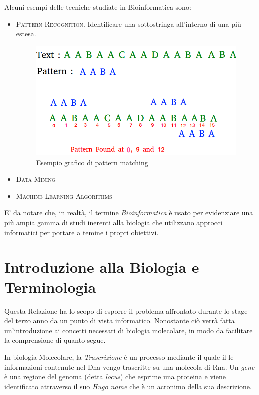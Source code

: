 Alcuni esempi delle tecniche studiate in Bioinformatica sono:

\begin{itemize}
    \item \textsc{Pattern Recognition.} Identificare una sottostringa all'interno di una più estesa.
        \begin{figure}[h]
        \centering
        \includegraphics[scale= 0.5]{images/pattern matching.png}
        \caption{Esempio grafico di pattern matching}
        \label{fig:pattern_matching}
        \end{figure}
    \item \textsc{Data Mining}
    \item \textsc{Machine Learning Algorithms}
\end{itemize}

E' da notare che, in realtà, il termine \textit{Bioinformatica} è usato per evidenziare una più ampia gamma di studi inerenti alla biologia che utilizzano approcci informatici per portare a temine i propri obiettivi.

\newpage

\section{Introduzione alla Biologia e Terminologia}
Questa Relazione ha lo scopo di esporre il problema affrontato durante lo stage del terzo anno da un punto di vista informatico. Nonostante ciò verrà fatta un'introduzione ai concetti necessari di biologia molecolare, in modo da facilitare la comprensione di quanto segue.

In biologia Molecolare, la \textit{Trascrizione} è un processo mediante il quale il le informazioni contenute nel Dna vengo trascritte su una molecola di Rna.
Un \textit{gene} è una regione del genoma (detta \textit{locus}) che esprime una proteina e viene identificato attraverso il suo \textit{Hugo name} che è un acronimo della sua descrizione.

